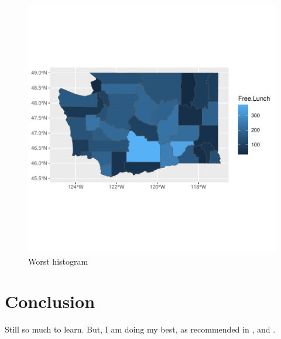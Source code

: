 \documentclass[a4paper, 12pt]{article}
\begin{document}
\begin{figure}[h]
\centering
\includegraphics{draft_paper_v2-theDeli_4}
\caption{Worst histogram}  %
\label{fig:theDeli_4} %
\end{figure}


\section{Conclusion}

Still so much to learn. But, I am doing my best, as recommended in \citet{magallanes_reyes_data_2022}, and \citet{leisch_sweave_2024}. 



\end{document}
